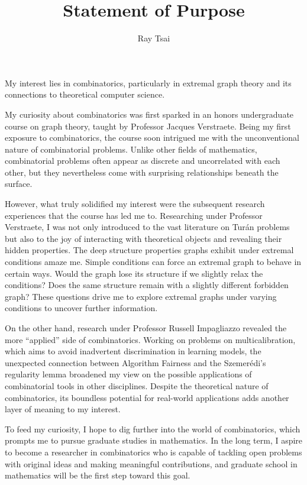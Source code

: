 \documentclass[12pt]{article}
\title{Statement of Purpose}
\author{Ray Tsai}
\date{}
\begin{document}
\maketitle

\vspace{-0.25in}

My interest lies in combinatorics, particularly in extremal graph theory and its connections
to theoretical computer science.

My curiosity about combinatorics was first sparked in an honors undergraduate course on graph
theory, taught by Professor Jacques Verstraete. Being my first exposure to combinatorics, the course
soon intrigued me with the unconventional nature of combinatorial problems. Unlike other fields of
mathematics, combinatorial problems often appear as discrete and uncorrelated with each other, but
they nevertheless come with surprising relationships beneath the surface.

However, what truly solidified my interest were the subsequent research experiences that the course
has led me to. Researching under Professor Verstraete, I was not only introduced to the vast
literature on Turán problems but also to the joy of interacting with theoretical objects and
revealing their hidden properties. The deep structure properties graphs exhibit under extremal
conditions amaze me. Simple conditions can force an extremal graph to behave in certain ways. Would
the graph lose its structure if we slightly relax the conditions? Does the same structure remain
with a slightly different forbidden graph? These questions drive me to explore extremal graphs under
varying conditions to uncover further information.

On the other hand, research under Professor Russell Impagliazzo revealed the more ``applied'' side
of combinatorics. Working on problems on multicalibration, which aims to avoid inadvertent
discrimination in learning models, the unexpected connection between Algorithm Fairness and the
Szemerédi's regularity lemma broadened my view on the possible applications of combinatorial tools
in other disciplines. Despite the theoretical nature of combinatorics, its boundless potential for
real-world applications adds another layer of meaning to my interest.

To feed my curiosity, I hope to dig further into the world of combinatorics, which prompts me to
pursue graduate studies in mathematics. In the long term, I aspire to become a researcher in
combinatorics who is capable of tackling open problems with original ideas and making meaningful
contributions, and graduate school in mathematics will be the first step toward this goal. 
\end{document}
